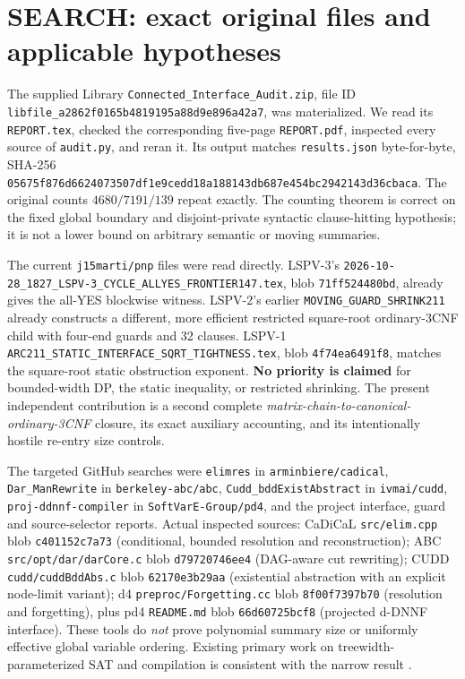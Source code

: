 \documentclass[11pt]{article}
\begin{document}
\section{SEARCH: exact original files and applicable hypotheses}
The supplied Library \texttt{Connected\_Interface\_Audit.zip}, file ID \texttt{libfile\_a2862f0165b4819195a88d9e896a42a7}, was materialized. We read its \texttt{REPORT.tex}, checked the corresponding five-page \texttt{REPORT.pdf}, inspected every source of \texttt{audit.py}, and reran it. Its output matches \texttt{results.json} byte-for-byte, SHA-256 \texttt{05675f876d6624073507df1e9cedd18a188143db687e454bc2942143d36cbaca}. The original counts $4680/7191/139$ repeat exactly. The counting theorem is correct on the fixed global boundary and disjoint-private syntactic clause-hitting hypothesis; it is not a lower bound on arbitrary semantic or moving summaries.

The current \texttt{j15marti/pnp} files were read directly. LSPV-3's \texttt{2026-10-28\_1827\_LSPV-3\_CYCLE\_ALLYES\_FRONTIER147.tex}, blob \texttt{71ff524480bd}, already gives the all-YES blockwise witness. LSPV-2's earlier \texttt{MOVING\_GUARD\_SHRINK211} already constructs a different, more efficient restricted square-root ordinary-3CNF child with four-end guards and 32 clauses. LSPV-1 \texttt{ARC211\_STATIC\_INTERFACE\_SQRT\_TIGHTNESS.tex}, blob \texttt{4f74ea6491f8}, matches the square-root static obstruction exponent. \textbf{No priority is claimed} for bounded-width DP, the static inequality, or restricted shrinking. The present independent contribution is a second complete \emph{matrix-chain-to-canonical-ordinary-3CNF} closure, its exact auxiliary accounting, and its intentionally hostile re-entry size controls.

The targeted GitHub searches were \texttt{elimres} in \texttt{arminbiere/cadical}, \texttt{Dar\_ManRewrite} in \texttt{berkeley-abc/abc}, \texttt{Cudd\_bddExistAbstract} in \texttt{ivmai/cudd}, \texttt{proj-ddnnf-compiler} in \texttt{SoftVarE-Group/pd4}, and the project interface, guard and source-selector reports. Actual inspected sources: CaDiCaL \texttt{src/elim.cpp} blob \texttt{c401152c7a73} (conditional, bounded resolution and reconstruction); ABC \texttt{src/opt/dar/darCore.c} blob \texttt{d79720746ee4} (DAG-aware cut rewriting); CUDD \texttt{cudd/cuddBddAbs.c} blob \texttt{62170e3b29aa} (existential abstraction with an explicit node-limit variant); d4 \texttt{preproc/Forgetting.cc} blob \texttt{8f00f7397b70} (resolution and forgetting), plus pd4 \texttt{README.md} blob \texttt{66d60725bcf8} (projected d-DNNF interface). These tools do \emph{not} prove polynomial summary size or uniformly effective global variable ordering. Existing primary work on treewidth-parameterized SAT and compilation is consistent with the narrow result \cite{samer,dm}.
\end{document}
